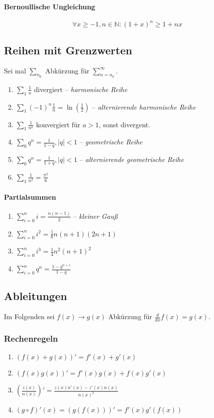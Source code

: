 \documentclass[a4paper, 9pt, DIV=24]{scrartcl}
\newcommand{\N}{\mathbb{N}}
\begin{document}
\paragraph{Bernoullische Ungleichung}
\[ \forall x\geq -1, n\in\N: (1+x)^n \geq 1 + nx \]

\subsection{Reihen mit Grenzwerten}
Sei mal $\sum_{n_0}$ Abkürzung für $\sum_{n=n_0}^\infty$.
\begin{enumerate}[label={(}\arabic*{)}]
 \item $\sum_1 \frac{1}{n}$ divergiert -- \emph{harmonische Reihe}
 \item $\sum_1 (-1)^n\frac{1}{n} = \ln(\frac{1}{2})$ -- \emph{alternierende harmonische Reihe}
 \item $\sum_1 \frac{1}{n^a}$ konvergiert für $a > 1$, sonst divergent.
 \item $\sum_0 q^n = \frac{1}{1-q}, |q| < 1$ -- \emph{geometrische Reihe}
 \item $\sum_0 q^n = \frac{1}{1+q}, |q| < 1$ -- \emph{alternierende geometrische Reihe}
 \item $\sum_1 \frac{1}{n^2} = \frac{\pi^2}{6}$
\end{enumerate}
\paragraph{Partialsummen}
\begin{enumerate}[label={(}\arabic*{)}]
 \item $\sum_{i=0}^n i = \frac{n(n-1)}{2}$ -- \emph{kleiner Gauß}
 \item $\sum_{i=0}^n i^2 = \frac{1}{6}n(n+1)(2n+1)$
 \item $\sum_{i=0}^n i^3 = \frac{1}{4}n^2(n+1)^2$
 \item $\sum_{i=0}^n q^n = \frac{1-q^{n+1}}{1-q}$
\end{enumerate}

\clearpage

\subsection{Ableitungen}
Im Folgenden sei $f(x) \rightarrow g(x)$ Abkürzung für $\frac{d}{dx} f(x) = g(x)$.
\subsubsection{Rechenregeln}
\begin{enumerate}[label={(}\arabic*{)}]
 \item $(f(x)+g(x))' = f'(x) + g'(x)$
 \item $(f(x)g(x))' = f'(x)g(x) + f(x)g'(x)$
 \item $(\frac{z(x)}{n(x)})' = \frac{z(x)n'(x) - z'(x)n(x)}{n(x)^2}$
 \item $(g \circ f)'(x) = (g(f(x)))' = f'(x)g'(f(x))$
\end{enumerate}
\end{document}
